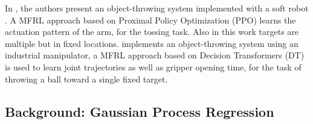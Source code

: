 In \cite{softToss_gripper}, the authors present an object-throwing system implemented with a soft robot \cite{della2020soft_robots}. A MFRL approach based on Proximal Policy Optimization (PPO) \cite{ppo} learns the actuation pattern of the arm, for the tossing task. Also in this work targets are multiple but in fixed locations. \cite{learning_ball_throwing_decision_transformers_gripper} implements an object-throwing system using an industrial manipulator, a MFRL approach based on Decision Transformers (DT) \cite{DT} is used to learn joint trajectories as well as gripper opening time, for the task of throwing a ball toward a single fixed target.


\subsection{Background: Gaussian Process Regression}
\label{sec:gp}


